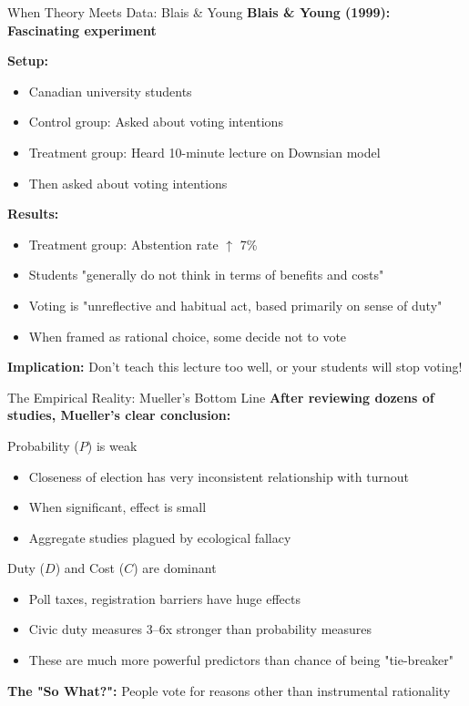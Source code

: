 \documentclass[10pt]{beamer}
\begin{document}
\begin{frame}{When Theory Meets Data: Blais \& Young}
\textbf{Blais \& Young (1999): Fascinating experiment}


\textbf{Setup:}
\begin{itemize}
\item Canadian university students
\item Control group: Asked about voting intentions
\item Treatment group: Heard 10-minute lecture on Downsian model
\item Then asked about voting intentions
\end{itemize}


\textbf{Results:}
\begin{itemize}
\item Treatment group: Abstention rate $\uparrow$ 7\%
\item Students "generally do not think in terms of benefits and costs"
\item Voting is "unreflective and habitual act, based primarily on sense of duty"
\item When framed as rational choice, some decide not to vote
\end{itemize}


\textbf{Implication:} Don't teach this lecture too well, or your students will stop voting!
\end{frame}

\begin{frame}{The Empirical Reality: Mueller's Bottom Line}
\textbf{After reviewing dozens of studies, Mueller's clear conclusion:}


\begin{alertblock}{Probability ($P$) is weak}
\begin{itemize}
\item Closeness of election has very inconsistent relationship with turnout
\item When significant, effect is small
\item Aggregate studies plagued by ecological fallacy
\end{itemize}
\end{alertblock}


\begin{exampleblock}{Duty ($D$) and Cost ($C$) are dominant}
\begin{itemize}
\item Poll taxes, registration barriers have huge effects
\item Civic duty measures 3--6x stronger than probability measures
\item These are much more powerful predictors than chance of being "tie-breaker"
\end{itemize}
\end{exampleblock}


\textbf{The "So What?":} People vote for reasons other than instrumental rationality
\end{frame}
\end{document}
